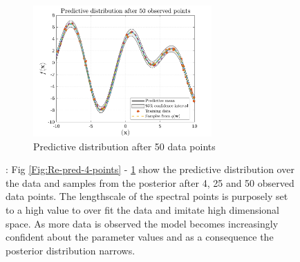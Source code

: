 \begin{figure}[htbp]
  \begin{subfigure}[b]{0.95\linewidth}
    \centering
    \includegraphics[trim={0 0.1cm 0 0.70cm},clip,height=0.27\textheight,width=0.75\textwidth]{Chapter3/Figures/func_uncertainty_3.png} 
    \caption{Predictive distribution after 50 data points} 
    \label{Fig:Re-pred-50-points}
  \end{subfigure}
 
\caption[Reduction in epistemic uncertainty with added data]{: Fig \ref{Fig:Re-pred-4-points} - \ref{Fig:Re-pred-50-points} show the predictive distribution over the data and samples from the posterior after 4, 25 and 50 observed data points. The lengthscale of the spectral points is purposely set to a high value to over fit the data and imitate high dimensional space. As more data is observed the model becomes increasingly confident about the parameter values and as a consequence the posterior distribution narrows.}
\label{Fig:Re-predictive-fit-to-varying-number-of-datapoints} 
\end{figure}

